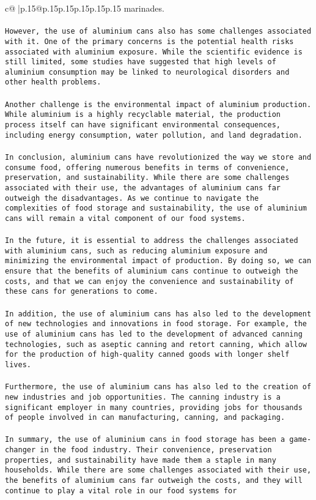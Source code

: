 \documentclass{article}
\begin{document}
{\begin{supertabular}{c@{$\;$}|p{.15\linewidth}@{}p{.15\linewidth}p{.15\linewidth}p{.15\linewidth}p{.15\linewidth}p{.15\linewidth}}
{{{marinades.\\ \tt \\ \tt However, the use of aluminium cans also has some challenges associated with it. One of the primary concerns is the potential health risks associated with aluminium exposure. While the scientific evidence is still limited, some studies have suggested that high levels of aluminium consumption may be linked to neurological disorders and other health problems.\\ \tt \\ \tt Another challenge is the environmental impact of aluminium production. While aluminium is a highly recyclable material, the production process itself can have significant environmental consequences, including energy consumption, water pollution, and land degradation.\\ \tt \\ \tt In conclusion, aluminium cans have revolutionized the way we store and consume food, offering numerous benefits in terms of convenience, preservation, and sustainability. While there are some challenges associated with their use, the advantages of aluminium cans far outweigh the disadvantages. As we continue to navigate the complexities of food storage and sustainability, the use of aluminium cans will remain a vital component of our food systems.\\ \tt \\ \tt In the future, it is essential to address the challenges associated with aluminium cans, such as reducing aluminium exposure and minimizing the environmental impact of production. By doing so, we can ensure that the benefits of aluminium cans continue to outweigh the costs, and that we can enjoy the convenience and sustainability of these cans for generations to come.\\ \tt \\ \tt In addition, the use of aluminium cans has also led to the development of new technologies and innovations in food storage. For example, the use of aluminium cans has led to the development of advanced canning technologies, such as aseptic canning and retort canning, which allow for the production of high-quality canned goods with longer shelf lives.\\ \tt \\ \tt Furthermore, the use of aluminium cans has also led to the creation of new industries and job opportunities. The canning industry is a significant employer in many countries, providing jobs for thousands of people involved in can manufacturing, canning, and packaging.\\ \tt \\ \tt In summary, the use of aluminium cans in food storage has been a game-changer in the food industry. Their convenience, preservation properties, and sustainability have made them a staple in many households. While there are some challenges associated with their use, the benefits of aluminium cans far outweigh the costs, and they will continue to play a vital role in our food systems for }}}
\end{supertabular}}
\end{document}
